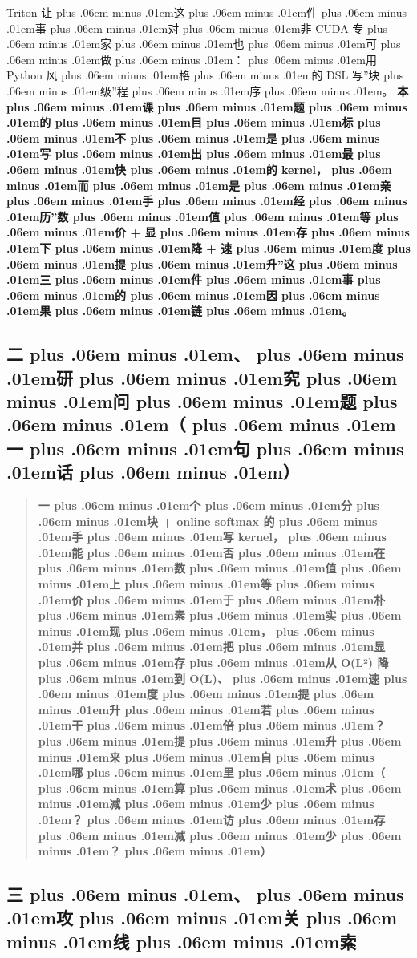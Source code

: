 \documentclass[
]{article}
\def\zh#1{{\zhfont #1}}
\def\sym#1{{\symfont #1}}
\def\zhglue{\hskip0pt plus .06em minus .01em}
\begin{document}
Triton \zh{让\zhglue 这\zhglue 件\zhglue 事\zhglue 对\zhglue 非} CUDA \zh{专\zhglue 家\zhglue 也\zhglue 可\zhglue 做\zhglue ：\zhglue 用} Python \zh{风\zhglue 格\zhglue 的} DSL \zh{写}''\zh{块\zhglue 级}''\zh{程\zhglue 序\zhglue 。} \textbf{\zh{本\zhglue 课\zhglue 题\zhglue 的\zhglue 目\zhglue 标\zhglue 不\zhglue 是\zhglue 写\zhglue 出\zhglue 最\zhglue 快\zhglue 的} kernel\zh{，\zhglue 而\zhglue 是\zhglue 亲\zhglue 手\zhglue 经\zhglue 历}''\zh{数\zhglue 值\zhglue 等\zhglue 价} + \zh{显\zhglue 存\zhglue 下\zhglue 降} + \zh{速\zhglue 度\zhglue 提\zhglue 升}''\zh{这\zhglue 三\zhglue 件\zhglue 事\zhglue 的\zhglue 因\zhglue 果\zhglue 链\zhglue 。}}

\subsection{\zh{二\zhglue 、\zhglue 研\zhglue 究\zhglue 问\zhglue 题\zhglue （\zhglue 一\zhglue 句\zhglue 话\zhglue ）}}\label{ux4e8cux7814ux7a76ux95eeux9898ux4e00ux53e5ux8bdd}

\begin{quote}
\textbf{\zh{一\zhglue 个\zhglue 分\zhglue 块} + online softmax \zh{的\zhglue 手\zhglue 写} kernel\zh{，\zhglue 能\zhglue 否\zhglue 在\zhglue 数\zhglue 值\zhglue 上\zhglue 等\zhglue 价\zhglue 于\zhglue 朴\zhglue 素\zhglue 实\zhglue 现\zhglue ，\zhglue 并\zhglue 把\zhglue 显\zhglue 存\zhglue 从} O(L\sym{²}) \zh{降\zhglue 到} O(L)\zh{、\zhglue 速\zhglue 度\zhglue 提\zhglue 升\zhglue 若\zhglue 干\zhglue 倍\zhglue ？\zhglue 提\zhglue 升\zhglue 来\zhglue 自\zhglue 哪\zhglue 里\zhglue （\zhglue 算\zhglue 术\zhglue 减\zhglue 少\zhglue ？\zhglue 访\zhglue 存\zhglue 减\zhglue 少\zhglue ？\zhglue ）}}
\end{quote}

\subsection{\zh{三\zhglue 、\zhglue 攻\zhglue 关\zhglue 线\zhglue 索}}\label{ux4e09ux653bux5173ux7ebfux7d22}
\end{document}
